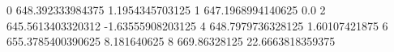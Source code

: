 0 648.392333984375 1.1954345703125
1 647.1968994140625 0.0
2 645.5613403320312 -1.63555908203125
4 648.7979736328125 1.60107421875
6 655.3785400390625 8.181640625
8 669.86328125 22.6663818359375
